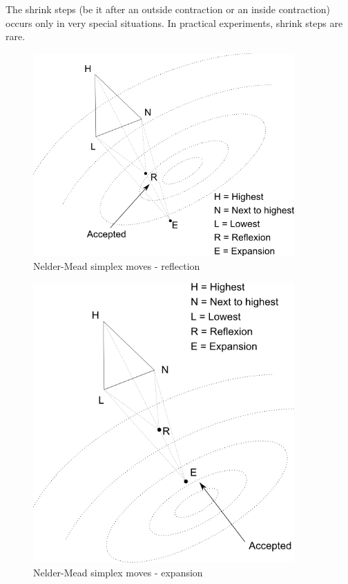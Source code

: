 The shrink steps (be it after an outside contraction or an inside 
contraction) occurs only in very special situations. In practical experiments,
shrink steps are rare.

\begin{figure}
\begin{center}
\includegraphics[width=10cm]{nelder-mead-reflection.png}
\end{center}
\caption{Nelder-Mead simplex moves - reflection}
\label{fig-nm-moves-reflection}
\end{figure}

\begin{figure}
\begin{center}
\includegraphics[width=10cm]{nelder-mead-extension.png}
\end{center}
\caption{Nelder-Mead simplex moves - expansion}
\label{fig-nm-moves-expansion}
\end{figure}

